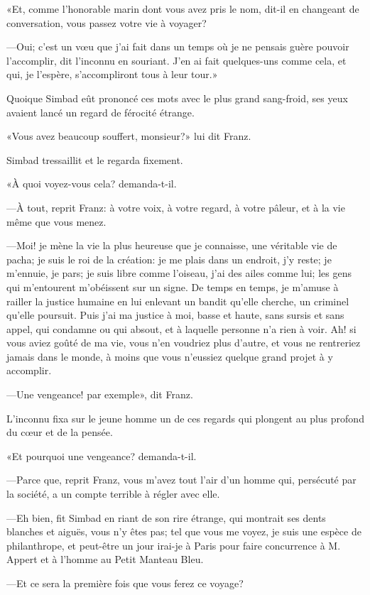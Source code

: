«Et, comme l'honorable marin dont vous avez pris le nom, dit-il en changeant de conversation, vous passez votre vie à voyager?

—Oui; c'est un vœu que j'ai fait dans un temps où je ne pensais guère pouvoir l'accomplir, dit l'inconnu en souriant. J'en ai fait quelques-uns comme cela, et qui, je l'espère, s'accompliront tous à leur tour.»

Quoique Simbad eût prononcé ces mots avec le plus grand sang-froid, ses yeux avaient lancé un regard de férocité étrange.

«Vous avez beaucoup souffert, monsieur?» lui dit Franz.

Simbad tressaillit et le regarda fixement.

«À quoi voyez-vous cela? demanda-t-il.

—À tout, reprit Franz: à votre voix, à votre regard, à votre pâleur, et à la vie même que vous menez.

—Moi! je mène la vie la plus heureuse que je connaisse, une véritable vie de pacha; je suis le roi de la création: je me plais dans un endroit, j'y reste; je m'ennuie, je pars; je suis libre comme l'oiseau, j'ai des ailes comme lui; les gens qui m'entourent m'obéissent sur un signe. De temps en temps, je m'amuse à railler la justice humaine en lui enlevant un bandit qu'elle cherche, un criminel qu'elle poursuit. Puis j'ai ma justice à moi, basse et haute, sans sursis et sans appel, qui condamne ou qui absout, et à laquelle personne n'a rien à voir. Ah! si vous aviez goûté de ma vie, vous n'en voudriez plus d'autre, et vous ne rentreriez jamais dans le monde, à moins que vous n'eussiez quelque grand projet à y accomplir.

—Une vengeance! par exemple», dit Franz.

L'inconnu fixa sur le jeune homme un de ces regards qui plongent au plus profond du cœur et de la pensée.

«Et pourquoi une vengeance? demanda-t-il.

—Parce que, reprit Franz, vous m'avez tout l'air d'un homme qui, persécuté par la société, a un compte terrible à régler avec elle.

—Eh bien, fit Simbad en riant de son rire étrange, qui montrait ses dents blanches et aiguës, vous n'y êtes pas; tel que vous me voyez, je suis une espèce de philanthrope, et peut-être un jour irai-je à Paris pour faire concurrence à M. Appert et à l'homme au Petit Manteau Bleu.

—Et ce sera la première fois que vous ferez ce voyage?

